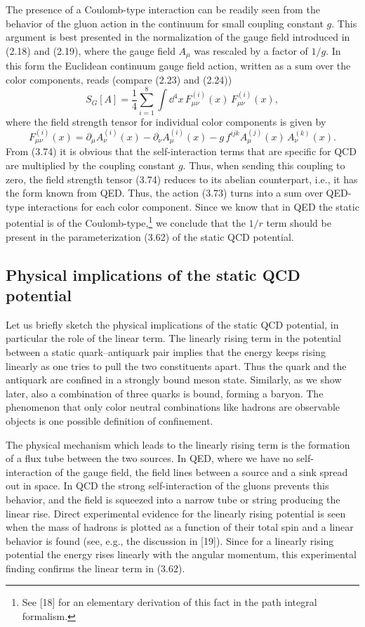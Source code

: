 The presence of a Coulomb-type interaction can be readily seen from the
behavior of the gluon action in the continuum for small coupling constant $g$.
This argument is best presented in the normalization of the gauge field
introduced in (2.18) and (2.19), where the gauge field $A_\mu$ was rescaled by
a factor of $1/g$. In this form the Euclidean continuum gauge field action,
written as a sum over the color components, reads (compare (2.23) and (2.24))
\begin{equation}
  S_G[A] = \frac{1}{4}\sum_{i=1}^{8}\int \dd^4 x\,
    F^{(i)}_{\mu\nu}(x)\,F^{(i)}_{\mu\nu}(x) ,
\end{equation}
where the field strength tensor for individual color components is given by
\begin{equation}
  F^{(i)}_{\mu\nu}(x)
  = \partial_\mu A^{(i)}_{\nu}(x) - \partial_\nu A^{(i)}_{\mu}(x)
  - g\, f^{ijk} A^{(j)}_{\mu}(x)\,A^{(k)}_{\nu}(x) .
\end{equation}
From (3.74) it is obvious that the self-interaction terms that are specific for
QCD are multiplied by the coupling constant $g$. Thus, when sending this
coupling to zero, the field strength tensor (3.74) reduces to its abelian
counterpart, i.e., it has the form known from QED. Thus, the action (3.73)
turns into a sum over QED-type interactions for each color component. Since we
know that in QED the static potential is of the Coulomb-type,\footnote{See [18]
for an elementary derivation of this fact in the path integral formalism.} we
conclude that the $1/r$ term should be present in the parameterization (3.62)
of the static QCD potential.

\subsection{Physical implications of the static QCD potential}

Let us briefly sketch the physical implications of the static QCD potential, in
particular the role of the linear term. The linearly rising term in the
potential between a static quark--antiquark pair implies that the energy keeps
rising linearly as one tries to pull the two constituents apart. Thus the quark
and the antiquark are confined in a strongly bound meson state. Similarly, as
we show later, also a combination of three quarks is bound, forming a baryon.
The phenomenon that only color neutral combinations like hadrons are observable
objects is one possible definition of confinement.

The physical mechanism which leads to the linearly rising term is the formation
of a flux tube between the two sources. In QED, where we have no
self-interaction of the gauge field, the field lines between a source and a
sink spread out in space. In QCD the strong self-interaction of the gluons
prevents this behavior, and the field is squeezed into a narrow tube or string
producing the linear rise. Direct experimental evidence for the linearly rising
potential is seen when the mass of hadrons is plotted as a function of their
total spin and a linear behavior is found (see, e.g., the discussion in [19]).
Since for a linearly rising potential the energy rises linearly with the
angular momentum, this experimental finding confirms the linear term in (3.62).

